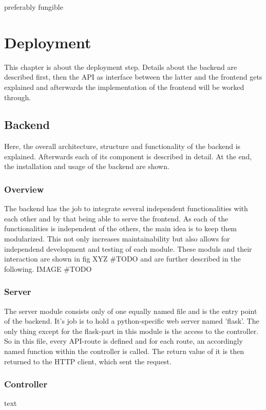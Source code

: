 
preferably fungible

\chapter{Deployment}
This chapter is about the deployment step. Details about the backend are described first, then the API as interface between the latter and the frontend gets explained and afterwards the implementation of the frontend will be worked through.

\section{Backend}
Here, the overall architecture, structure and functionality of the backend is explained. Afterwards each of its component is described in detail. At the end, the installation and usage of the backend are shown.

\subsection{Overview}
The backend has the job to integrate several independent functionalities with each other and by that being able to serve the frontend.
As each of the functionalities is independent of the others, the main idea is to keep them modularized. This not only increases maintainability but also allows for independend development and testing of each module. These moduls and their interaction are shown in fig XYZ \#TODO and are further described in the following.
IMAGE \#TODO

\subsection{Server}
The server module consists only of one equally named file and is the entry point of the backend. It's job is to hold a python-specific web server named 'flask'. The only thing except for the flask-part in this module is the access to the controller.
\newline
So in this file, every API-route is defined and for each route, an accordingly named function within the controller is called. The return value of it is then returned to the HTTP client, which sent the request.

\subsection{Controller}
text

